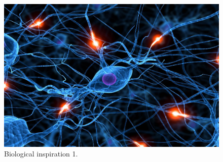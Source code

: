 \begin{figure}[!htb]
\centering
\includegraphics[width=.50\columnwidth]{images/048neuron0}
\caption[Biological inspiration 1]{Biological inspiration 1.}
\label{fig:048neuron0}
\end{figure}